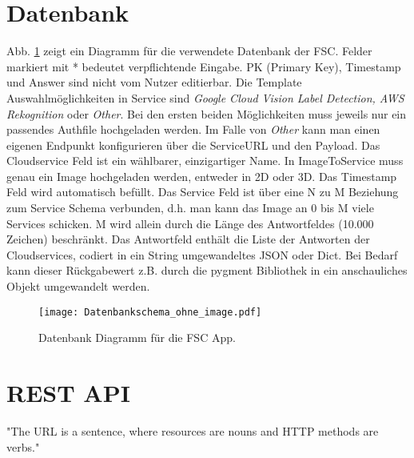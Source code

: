 \section{Datenbank}
Abb. \ref{img:Datenbank} zeigt ein Diagramm für die verwendete Datenbank der FSC. Felder markiert mit * bedeutet verpflichtende Eingabe. PK (Primary Key), Timestamp und Answer sind nicht vom Nutzer editierbar. Die Template Auswahlmöglichkeiten in Service sind \emph{Google Cloud Vision Label Detection, AWS Rekognition} oder \emph{Other}. Bei den ersten beiden Möglichkeiten muss jeweils nur ein passendes Authfile hochgeladen werden. Im Falle von \emph{Other} kann man einen eigenen Endpunkt konfigurieren über die ServiceURL und den Payload. Das Cloudservice Feld ist ein wählbarer, einzigartiger Name. In ImageToService muss genau ein Image hochgeladen werden, entweder in 2D oder 3D. Das Timestamp Feld wird automatisch befüllt. Das Service Feld ist über eine N zu M Beziehung zum Service Schema verbunden, d.h. man kann das Image an 0 bis M viele Services schicken. M wird allein durch die Länge des Antwortfeldes (10.000 Zeichen) beschränkt. Das Antwortfeld enthält die Liste der Antworten der Cloudservices, codiert in ein String umgewandeltes JSON oder Dict. Bei Bedarf kann dieser Rückgabewert z.B. durch die pygment Bibliothek in ein anschauliches Objekt umgewandelt werden.
\begin{figure}[H]
\texttt{[image: Datenbankschema\_ohne\_image.pdf]}
\caption{Datenbank Diagramm für die FSC App.}
\label{img:Datenbank}
\end{figure}

\section{REST API}

\begin{displayquote}
"The URL is a sentence, where resources are nouns and HTTP methods are verbs."\cite{Haldar_2018}
\end{displayquote}

